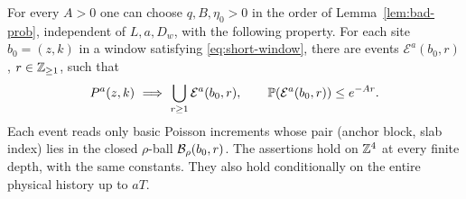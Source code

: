 \begin{proposition}\label{prop:witness}
For every \(A>0\) one can choose \(q,B,\eta_0>0\) in the order of
Lemma~\ref{lem:bad-prob}, independent of \(L,a,D_w\), with the
following property. For each site \(b_0=(z,k)\) in a window satisfying
\eqref{eq:short-window}, there are events
\(\mathcal E^a(b_0,r)\), \(r\in\mathbb Z_{\ge1}\), such that
\begin{equation}\label{eq:witness-cover}
 P^a(z,k)\ \Longrightarrow\
       \bigcup_{r\ge1}\mathcal E^a(b_0,r),\qquad
 \mathbb P(\mathcal E^a(b_0,r))\le e^{-Ar}.
\end{equation}
Each event reads only basic Poisson increments whose pair
(anchor block, slab index) lies in the closed \(\rho\)-ball
\(\mathcal B_\rho(b_0,r)\). The assertions hold on \(\mathbb Z^4\) at every
finite depth, with the same constants. They also hold conditionally
on the entire physical history up to \(aT\).
\end{proposition}
